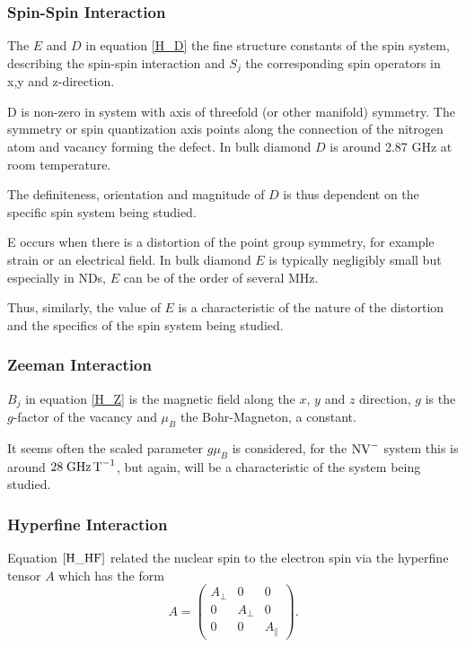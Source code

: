 \subsubsection{Spin-Spin Interaction}


The $E$ and $D$ in equation \ref{H_D} the fine structure constants of the spin
system, describing the spin-spin interaction and $S_j$ the corresponding spin operators
in x,y and z-direction. 

D is non-zero in system with axis of threefold (or other manifold) symmetry. 
The symmetry or spin quantization axis points along the connection of the nitrogen
atom and vacancy forming the defect. In bulk diamond $D$ is around 2.87 GHz at room temperature.

The definiteness, orientation and magnitude of $D$ is thus dependent on the specific spin system being studied. 

E occurs when there is a distortion of the point group symmetry, for example strain or an electrical field. In bulk diamond $E$ is typically negligibly small but especially in NDs, $E$ can be of the order of several MHz. 

Thus, similarly, the value of $E$ is a characteristic of the nature of the distortion and 
the specifics of the spin system being studied. 

\subsubsection{Zeeman Interaction}

$B_j$ in equation \ref{H_Z} is the magnetic field along the $x$, $y$ and $z$ direction, $g$ is the $g$-factor of the vacancy and $\mu_B$ the Bohr-Magneton, a constant. 

It seems often the scaled parameter $g\mu_B$ is considered, for the $\ce{NV^-}$ system this is around $28\;\ce{ GHz T^{-1}}$, but again, will be a characteristic of the system being studied. 

\subsubsection{Hyperfine Interaction}

Equation $\ref{H_HF}$ related the nuclear spin to the electron spin via the hyperfine tensor $A$ which has the form 
\begin{equation}
    A = \begin{pmatrix}
        A_\perp & 0 & 0 \\ 
        0 & A_\perp & 0 \\ 
        0 & 0 & A_\parallel
    \end{pmatrix}.
    \label{eq:hyperfine_tensor}
\end{equation}

